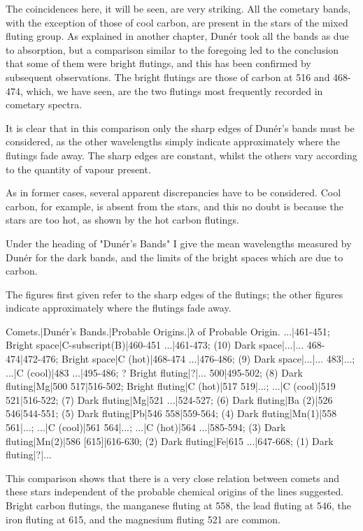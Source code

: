 \documentclass[a4paper, 12pt, oneside, polutonikogreek, english]{article}
\begin{document}
The coincidences here, it will be seen, are very striking. All the cometary bands, with the exception of those of cool carbon, are present in the stars of the mixed fluting group. As explained in another chapter, Dunér took all the bands as due to absorption, but a comparison similar to the foregoing led to the conclusion that some of them were bright flutings, and this has been confirmed by subsequent observations. The bright flutings are those of carbon at 516 and 468-474, which, we have seen, are the two flutings most frequently recorded in cometary spectra.

It is clear that in this comparison only the sharp edges of Dunér's bands must be considered, as the other wavelengths simply indicate approximately where the flutings fade away. The sharp edges are constant, whilst the others vary according to the quantity of vapour present.

As in former cases, several apparent discrepancies have to be considered. Cool carbon, for example, is absent from the stars, and this no doubt is because the stars are too hot, as shown by the hot carbon flutings.

Under the heading of "Dunér's Bands" I give the mean wavelengths measured by Dunér for the dark bands, and the limits of the bright spaces which are due to carbon.

The figures first given refer to the sharp edges of the flutings; the other figures indicate approximately where the flutings fade away.

Comets.|Dunér's Bands.|Probable Origins.|λ of Probable Origin. 
...|461-451; Bright space|C-subscript(B)|460-451 
...|461-473; (10) Dark space|...|... 
468-474|472-476; Bright space|C (hot)|468-474 
...|476-486; (9) Dark space|...|... 
483|...; ...|C (cool)|483 
...|495-486; ? Bright fluting|?|... 
500|495-502; (8) Dark fluting|Mg|500 
517|516-502; Bright fluting|C (hot)|517 
519|...; ...|C (cool)|519 
521|516-522; (7) Dark fluting|Mg|521 
...|524-527; (6) Dark fluting|Ba (2)|526 
546|544-551; (5) Dark fluting|Pb|546 
558|559-564; (4) Dark fluting|Mn(1)|558 
561|...; ...|C (cool)|561 
564|...; ...|C (hot)|564 
...|585-594; (3) Dark fluting|Mn(2)|586 
[615]|616-630; (2) Dark fluting|Fe|615 
...|647-668; (1) Dark fluting|?|... 

This comparison shows that there is a very close relation between comets and these stars independent of the probable chemical origins of the lines suggested. Bright carbon flutings, the manganese fluting at 558, the lead fluting at 546, the iron fluting at 615, and the magnesium fluting 521 are common.
\end{document}
